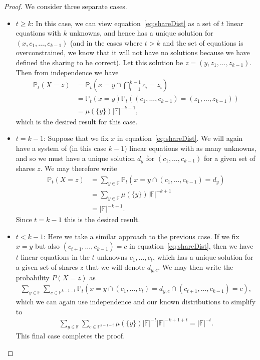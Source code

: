 \documentclass{article}
\theoremstyle{remark}
\newcommand{\F}{\mathbb{F}}
\renewcommand{\P}{\mathbb{P}}
\begin{document}
\begin{proof}
	We consider three separate cases.
	\begin{itemize}
		\item $t \ge k$: In this case, we can view
			equation~\eqref{eq:shareDist} as a set of $t$ linear equations with
			$k$ unknowns, and hence has a unique solution for $(x, c_1, \ldots,
			c_{k-1})$ (and in the cases where $t > k$ and the set of equations
			is overconstrained, we know that it will not have no solutions
			because we have defined the sharing to be correct). Let this
			solution be $z = (y, z_1, \ldots, z_{k-1})$. Then from independence
			we have
			\begin{align*}
				\P_t(X = z) &=
				\P_t\left(
					x = y \cap \bigcap_{i = 1}^{k-1} c_i = z_i
				\right)\\
				&= \P_t(x = y)
				\P_t((c_1, \ldots, c_{k-1}) = (z_1, \ldots, z_{k-1}))\\
				&= \mu(\{y\})|\F|^{-k+1},
			\end{align*}
			which is the desired result for this case.

		\item $t = k - 1$: Suppose that we fix $x$ in
			equation~\eqref{eq:shareDist}. We will again have a system of (in
			this case $k-1$) linear equations with as many unknowns, and so we
			must have a unique solution $d_y$ for $(c_1, \ldots, c_{k-1})$ for
			a given set of shares $z$. We may therefore write
			\begin{align*}
				\P_t(X = z) &=
				\sum_{y \in \F}
				\P_t(x = y \cap (c_1, \ldots, c_{k-1}) = d_y)\\
				&= \sum_{y \in \F} \mu(\{y\})|\F|^{-k+1}\\
				&= |\F|^{-k+1}.
			\end{align*}
			Since $t = k - 1$ this is the desired result.

		\item $t < k - 1$: Here we take a similar approach to the previous
			case. If we fix $x = y$ but also $(c_{t+1}, \ldots, c_{k-1}) = c$
			in equation~\eqref{eq:shareDist}, then we have $t$ linear equations
			in the $t$ unknowns $c_1, \ldots, c_t$, which has a unique solution
			for a given set of shares $z$ that we will denote $d_{y, c}$. We
			may then write the probability $P(X = z)$ as
			\begin{align*}
				\sum_{y \in \F}\sum_{c \in \F^{k - 1 - t}}
				\P_t(
					x = y \cap
					(c_1, \ldots, c_t) = d_{y, c} \cap
					(c_{t+1}, \ldots, c_{k-1}) = c
				),
			\end{align*}
			which we can again use independence and our known distributions to
			simplify to
			\begin{align*}
				\sum_{y \in \F}\sum_{c \in \F^{k - 1 - t}}
				\mu(\{y\})|\F|^{-t}|\F|^{-k+1+t}
				=
				|\F|^{-t}.
			\end{align*}
			This final case completes the proof.
	\end{itemize}
\end{proof}
\end{document}

